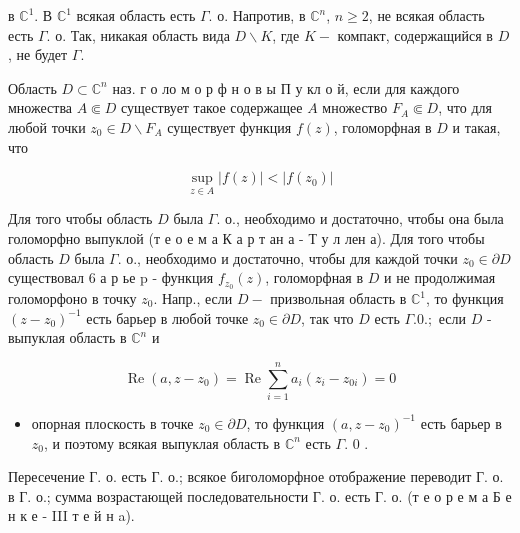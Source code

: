\documentclass[10pt]{article}
\begin{document}
в $\mathbb{C}^{1}$. В $\mathbb{C}^{1}$ всякая область есть $\Gamma$. о. Напротив, в $\mathbb{C}^{n}$, $n \geqslant 2$, не всякая область есть $\Gamma$. о. Так, никакая область вида $D \backslash K$, где $K-$ компакт, содержащийся в $D$, не будет $\Gamma$.



Область $D \subset \mathbb{C}^{n}$ наз. г о ло м о р ф н о в ы П у кл о й, если для каждого множества $A \Subset D$ существует такое содержащее $A$ множество $F_{A} \Subset D$, что для любой точки $z_{0} \in D \backslash F_{A}$ существует функция $f(z)$, голоморфная в $D$ и такая, что



\[

\sup _{z \in A}|f(z)|<\left|f\left(z_{0}\right)\right|

\]



Для того чтобы область $D$ была $\Gamma$. о., необходимо и достаточно, чтобы она была голоморфно выпуклой (т е о е м а К а р т ан а - Т у л лен а). Для того чтобы область $D$ была $\Gamma$. о., необходимо и достаточно, чтобы для каждой точки $z_{0} \in \partial D$ существовал 6 а р ье p - функция $f_{z_{0}}(z)$, голоморфная в $D$ и не продолжимая голоморфоно в точку $z_{0}$. Напр., если $D-$ призвольная область в $\mathbb{C}^{1}$, то функция $\left(z-z_{0}\right)^{-1}$ есть барьер в любой точке $z_{0} \in \partial D$, так что $D$ есть $\Gamma .0 . ;$ если $D$ - выпуклая область в $\mathbb{C}^{n}$ и



\[

\operatorname{Re}\left(a, z-z_{0}\right)=\operatorname{Re} \sum_{i=1}^{n} a_{i}\left(z_{i}-z_{0 i}\right)=0

\]



\begin{itemize}

  \item опорная плоскость в точке $z_{0} \in \partial D$, то функция $\left(a, z-z_{0}\right)^{-1}$ есть барьер в $z_{0}$, и поэтому всякая выпуклая область в $\mathbb{C}^{n}$ есть $\Gamma$. 0 .

\end{itemize}



Пересечение $Г$. о. есть $Г$. о.; всякое биголоморфное отображение переводит Г. о. в Г. о.; сумма возрастающей последовательности $Г$. о. есть $Г$. о. (т е о р е м а Б е н к е - III т е й н a).
\end{document}
